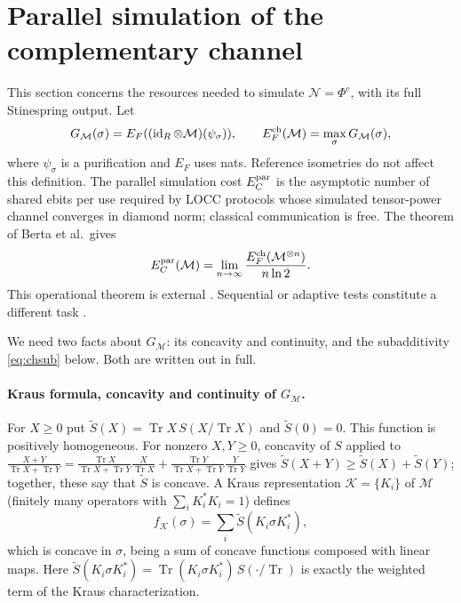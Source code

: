 \documentclass[11pt]{article}
\newcommand{\Tr}{\operatorname{Tr}}
\begin{document}
\section{Parallel simulation of the complementary channel}\label{sec:simulation}
This section concerns the resources needed to simulate $\mathcal N=\Phi^c$,
with its full Stinespring output. Let
\[
 G_{\mathcal M}(\sigma)=E_F((\operatorname{id}_R\otimes\mathcal M)(\psi_\sigma)),
 \qquad E_F^{\rm ch}(\mathcal M)=\max_\sigma G_{\mathcal M}(\sigma),
\]
where $\psi_\sigma$ is a purification and $E_F$ uses nats. Reference isometries
do not affect this definition. The parallel simulation cost $E_C^{\rm par}$
is the asymptotic number of shared ebits per use required by LOCC protocols
whose simulated tensor-power channel converges in diamond norm; classical
communication is free. The theorem of Berta et al.\ gives
\begin{equation}\label{eq:channelcostreg}
 E_C^{\rm par}(\mathcal M)=\lim_{n\to\infty}
       \frac{E_F^{\rm ch}(\mathcal M^{\otimes n})}{n\ln2}.
\end{equation}
This operational theorem is external \cite[Theorem 12]{bcbw}. Sequential or
adaptive tests constitute a different task \cite{wilde}.

We need two facts about $G_{\mathcal M}$: its concavity and continuity, and the subadditivity \eqref{eq:chsub} below. Both are written out in full.

\paragraph{Kraus formula, concavity and continuity of $G_{\mathcal M}$.}
For $X\ge0$ put $\widetilde S(X)=\Tr X\,S(X/\Tr X)$ and $\widetilde S(0)=0$. This function is positively homogeneous. For nonzero $X,Y\ge0$, concavity of $S$ applied to
$\frac{X+Y}{\Tr X+\Tr Y}=\frac{\Tr X}{\Tr X+\Tr Y}\frac X{\Tr X}+\frac{\Tr Y}{\Tr X+\Tr Y}\frac Y{\Tr Y}$
gives $\widetilde S(X+Y)\ge\widetilde S(X)+\widetilde S(Y)$; together, these say that $\widetilde S$ is concave. A Kraus representation $\mathcal K=\{K_i\}$ of $\mathcal M$ (finitely many operators with $\sum_iK_i^*K_i=1$) defines
\[
 f_{\mathcal K}(\sigma)=\sum_i\widetilde S(K_i\sigma K_i^*),
\]
which is concave in $\sigma$, being a sum of concave functions composed with linear maps. Here $\widetilde S(K_i\sigma K_i^*)=\Tr(K_i\sigma K_i^*)\,S(\cdot/\Tr)$ is exactly the weighted term of the Kraus characterization.
\end{document}
